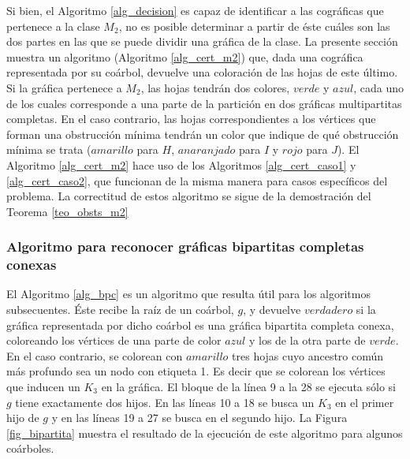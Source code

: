 Si bien, el Algoritmo \ref{alg_decision} es capaz de identificar a las cográficas que pertenece a la clase $M_2$, no es posible determinar a partir de éste cuáles son las dos partes en las que se puede dividir una gráfica de la clase. La presente sección muestra un algoritmo (Algoritmo \ref{alg_cert_m2}) que, dada una cográfica representada por su coárbol, devuelve una coloración de las hojas de este último. Si la gráfica pertenece a $M_2$, las hojas tendrán dos colores, $verde$ y $azul$, cada uno de los cuales corresponde a una parte de la partición en dos gráficas multipartitas completas. En el caso contrario, las hojas correspondientes a los vértices que forman una obstrucción mínima tendrán un color que indique de qué obstrucción mínima se trata ($amarillo$ para $H$, $anaranjado$ para $I$ y $rojo$ para $J$). El Algoritmo \ref{alg_cert_m2} hace uso de los Algoritmos \ref{alg_cert_caso1} y \ref{alg_cert_caso2}, que funcionan de la misma manera para casos específicos del problema. La correctitud de estos algoritmo se sigue de la demostración del Teorema \ref{teo_obsts_m2}

\subsubsection{Algoritmo para reconocer gráficas bipartitas completas conexas}

El Algoritmo \ref{alg_bpc} es un algoritmo que resulta útil para los algoritmos subsecuentes. Éste recibe la raíz de un coárbol, $g$, y devuelve $verdadero$ si la gráfica representada por dicho coárbol es una gráfica bipartita completa conexa, coloreando los vértices de una parte de color $azul$ y los de la otra parte de $verde$. En el caso contrario, se colorean con $amarillo$  tres hojas cuyo ancestro común más profundo sea un nodo con etiqueta 1. Es decir que se colorean los vértices que inducen un $K_3$ en la gráfica. El bloque de la línea 9 a la 28 se ejecuta sólo si $g$ tiene exactamente dos hijos. En las líneas 10 a 18 se busca un $K_3$ en el primer hijo de $g$ y en las líneas 19 a 27 se busca en el segundo hijo. La Figura \ref{fig_bipartita} muestra el resultado de la ejecución de este algoritmo para algunos coárboles.

